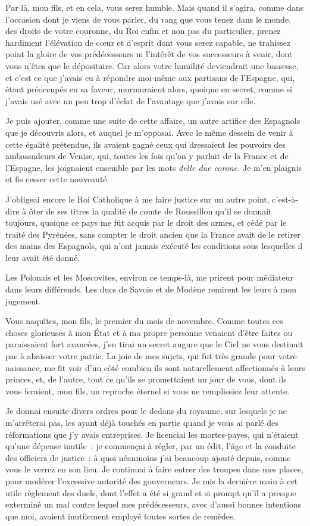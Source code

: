 \documentclass[french,twoside]{book} %
\begin{document}
Par là, mon fils, et en cela, vous serez humble. Mais quand il s’agira, comme dans l’occasion dont je viens de vous parler, du rang que vous tenez dans le monde, des droits de votre couronne, du Roi enfin et non pas du particulier, prenez hardiment l’élévation de cœur et d’esprit dont vous serez capable, ne trahissez point la gloire de vos prédécesseurs ni l’intérêt de vos successeurs à venir, dont vous n’êtes que le dépositaire. Car alors votre humilité deviendrait une bassesse, et c’est ce que j’avais eu à répondre moi-même aux partisans de l’Espagne, qui, étant préoccupés en sa faveur, murmuraient alors, quoique en secret, comme si j’avais usé avec un peu trop d’éclat de l’avantage que j’avais sur elle.\par
Je puis ajouter, comme une suite de cette affaire, un autre artifice des Espagnols que je découvris alors, et auquel je m’opposai. Avec le même dessein de venir à cette égalité prétendue, ils avaient gagné ceux qui dressaient les pouvoirs des ambassadeurs de Venise, qui, toutes les fois qu’on y parlait de la France et de l’Espagne, les joignaient ensemble par les mots {\itshape delle due corone.} Je m’en plaignis et fis cesser cette nouveauté.\par
J’obligeai encore le Roi Catholique à me faire justice sur un autre point, c’est-à-dire à ôter de ses titres la qualité de comte de Roussillon qu’il se donnait toujours, quoique ce pays me fût acquis par le droit des armes, et cédé par le traité des Pyrénées, sans compter le droit ancien que la France avait de le retirer des mains des Espagnols, qui n’ont jamais exécuté les conditions sous lesquelles il leur avait été donné.\par
Les Polonais et les Moscovites, environ ce temps-là, me prirent pour médiateur dans leurs différends. Les ducs de Savoie et de Modène remirent les leurs à mon jugement.\par
Vous naquîtes, mon fils, le premier du mois de novembre. Comme toutes ces choses glorieuses à mon État et à ma propre personne venaient d’être faites ou paraissaient fort avancées, j’en tirai un secret augure que le Ciel ne vous destinait pas à abaisser votre patrie. La joie de mes sujets, qui fut très grande pour votre naissance, me fit voir d’un côté combien ils sont naturellement affectionnés à leurs princes, et, de l’autre, tout ce qu’ils se promettaient un jour de vous, dont ils vous feraient, mon fils, un reproche éternel si vous ne remplissiez leur attente.\par
Je donnai ensuite divers ordres pour le dedans du royaume, sur lesquels je ne m’arrêterai pas, les ayant déjà touchés en partie quand je vous ai parlé des réformations que j’y avais entreprises. Je licenciai les mortes-payes, qui n’étaient qu’une dépense inutile ; je commençai à régler, par un édit, l’âge et la conduite des officiers de justice : à quoi néanmoins j’ai beaucoup ajouté depuis, comme vous le verrez en son lieu. Je continuai à faire entrer des troupes dans mes places, pour modérer l’excessive autorité des gouverneurs. Je mis la dernière main à cet utile règlement des duels, dont l’effet a été si grand et si prompt qu’il a presque exterminé un mal contre lequel mes prédécesseurs, avec d’aussi bonnes intentions que moi, avaient inutilement employé toutes sortes de remèdes.\par
\end{document}
